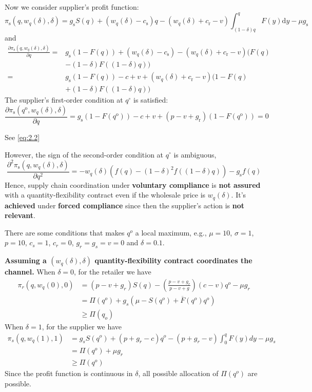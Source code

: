 Now we consider supplier's profit function:
$$
\pi_{\mathrm{s}}\left(q, w_{q}(\delta), \delta\right)=g_{\mathrm{s}} S(q)+\left(w_{q}(\delta)-c_{\mathrm{s}}\right) q-\left(w_{q}(\delta)+c_{\mathrm{r}}-v\right) \int_{(1-\delta) q}^{q} F(y) \mathrm{d} y-\mu g_{\mathrm{s}}
$$
and
$$
\begin{aligned}
\frac{\partial \pi_{\mathrm{s}}\left(q, w_{q}(\delta), \delta\right)}{\partial q}=& g_{\mathrm{s}}(1-F(q))+\left(w_{q}(\delta)-c_{\mathrm{s}}\right)-\left(w_{q}(\delta)+c_{\mathrm{r}}-v\right)(F(q)\\
&-(1-\delta) F((1-\delta) q)) \\
=& g_{\mathrm{s}}(1-F(q))-c+v+\left(w_{q}(\delta)+c_{\mathrm{r}}-v\right)(1-F(q)\\
&+(1-\delta) F((1-\delta) q))
\end{aligned}
$$
The supplier's first-order condition at $q^{\circ}$ is satisfied:
$$
\frac{\partial \pi_{\mathrm{s}}\left(q^{\mathrm{o}}, w_{q}(\delta), \delta\right)}{\partial q}=g_{\mathrm{s}}\left(1-F\left(q^{\mathrm{o}}\right)\right)-c+v+\left(p-v+g_{\mathrm{r}}\right)\left(1-F\left(q^{\mathrm{o}}\right)\right)=0
$$
\begin{note}
    See \autoref{eq:2.2}
\end{note}
However, the sign of the second-order condition at $q^{\circ}$ is ambiguous,
$$
\frac{\partial^{2} \pi_{\mathrm{s}}\left(q, w_{q}(\delta), \delta\right)}{\partial q^{2}}=-w_{q}(\delta)\left(f(q)-(1-\delta)^{2} f((1-\delta) q)\right)-g_{\mathrm{s}} f(q)
$$
Hence, supply chain coordination under \textbf{voluntary compliance} is \textbf{not assured} with a quantity-flexibility contract even if the wholesale price is $w_q(\delta)$. It's \textbf{achieved} under \textbf{forced compliance} since then the supplier's action is \textbf{not relevant}.
\begin{note}
    There are some conditions that makes $q^o$ a local maximum, e.g., $\mu=10$, $\sigma=1$, $p=10$, $c_s=1$, $c_r=0$, $g_r=g_s=v=0$ and $\delta=0.1$. 
\end{note}

\textbf{Assuming a $(w_q(\delta),\delta)$ quantity-flexibility contract coordinates the channel.} When $\delta=0$, for the retailer we have
\begin{align*}
    \pi_r(q,w_q(0),0)&=(p-v+g_r)S(q)-\left(\frac{p-v+g_r}{p-v+g}\right)(c-v)q^o-\mu g_r\\
    &=\Pi(q^o)+g_s\left(\mu-S(q^o)+\overline{F}(q^o) q^o \right)\\
    &\geq \Pi(q_o)
\end{align*}
When $\delta=1$, for the supplier we have
\begin{align*}
    \pi_s(q,w_q(1),1)&=g_s S(q^o)+(p+g_r-c)q^o-(p+g_r-v)\int_0^q F(y)dy-\mu g_s\\
    &=\Pi(q^o)+\mu g_r\\
    &\geq \Pi(q^o)
\end{align*}
Since the profit function is continuous in $\delta$, all possible allocation of $\Pi(q^o)$ are possible.

